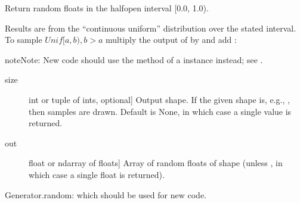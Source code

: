 \documentclass[letterpaper,10pt,english]{sphinxmanual}
\begin{document}
\begin{fulllineitems}
\label{\detokenize{infrapy.utils:infrapy.utils.ref2sac.random_sample}}
Return random floats in the half\sphinxhyphen{}open interval {[}0.0, 1.0).

Results are from the “continuous uniform” distribution over the
stated interval.  To sample \(Unif[a, b), b > a\) multiply
the output of  by  and add :

\begin{sphinxVerbatim}[commandchars=\\\{\}]
      
\end{sphinxVerbatim}

\begin{sphinxadmonition}{note}{Note:}
New code should use the  method of a 
instance instead; see .
\end{sphinxadmonition}
\begin{description}
\item[{size}] \leavevmode{[}int or tuple of ints, optional{]}
Output shape.  If the given shape is, e.g., , then
 samples are drawn.  Default is None, in which case a
single value is returned.

\end{description}
\begin{description}
\item[{out}] \leavevmode{[}float or ndarray of floats{]}
Array of random floats of shape  (unless , in which
case a single float is returned).

\end{description}

Generator.random: which should be used for new code.

\begin{sphinxVerbatim}[commandchars=\\\{\}]
\end{sphinxVerbatim}


\end{fulllineitems}
\end{document}
